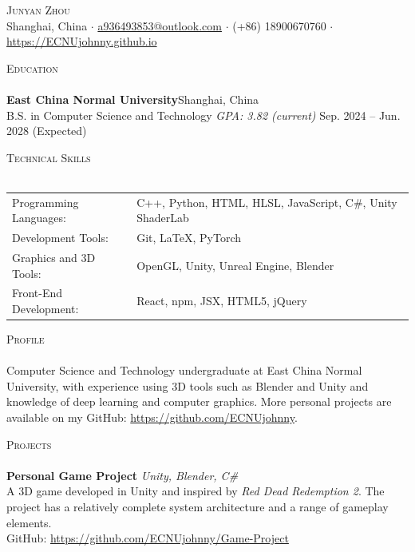 \documentclass[a4paper, 11pt]{article}
\newcommand{\lineunder} {
    \vspace*{-8pt} \\
    \hspace*{-18pt} \hrulefill \\
}
\newcommand{\header} [1] {
    {\hspace*{-18pt}\vspace*{6pt} \textsc{#1}}
    \vspace*{-6pt} \lineunder
}
\begin{document}
\vspace*{-40pt}

\vspace*{-10pt}
\begin{center}
    {\Huge \scshape {Junyan Zhou}}\\
    Shanghai, China $\cdot$ \href{mailto:a936493853@outlook.com}{a936493853@outlook.com} $\cdot$ (+86) 18900670760 $\cdot$ \url{https://ECNUjohnny.github.io}\\
\end{center}

\header{Education}
\textbf{East China Normal University}\hfill Shanghai, China\\
B.S. in Computer Science and Technology \textit{GPA: 3.82 (current)} \hfill Sep. 2024 -- Jun. 2028 (Expected)\\
\vspace{3mm}

\header{Technical Skills}
\begin{tabular}{ l l }
    Programming Languages: & C++, Python, HTML, HLSL, JavaScript, C\#, Unity ShaderLab \\
    Development Tools: & Git, LaTeX, PyTorch \\
    Graphics and 3D Tools: & OpenGL, Unity, Unreal Engine, Blender \\
    Front-End Development: & React, npm, JSX, HTML5, jQuery \\
\end{tabular}
\vspace{3mm}

\header{Profile}
Computer Science and Technology undergraduate at East China Normal University, with experience using 3D tools such as Blender and Unity and knowledge of deep learning and computer graphics. More personal projects are available on my GitHub: \url{https://github.com/ECNUjohnny}.\\
\vspace*{3mm}

\header{Projects}
{\textbf{Personal Game Project}} {\sl Unity, Blender, C\#} \\
A 3D game developed in Unity and inspired by \textit{Red Dead Redemption 2}. The project has a relatively complete system architecture and a range of gameplay elements.\\
GitHub: \url{https://github.com/ECNUjohnny/Game-Project}\\
\vspace*{3mm}
\end{document}
